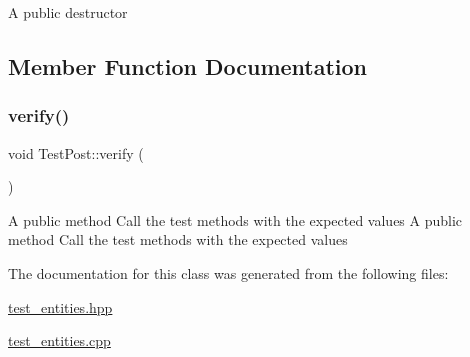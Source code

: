 A public destructor 

\subsection{Member Function Documentation}
\mbox{\label{class_test_post_a8e4d52190e6be295d251dfc348591b92}} 
\subsubsection{\texorpdfstring{verify()}{verify()}}
{\footnotesize\ttfamily void Test\+Post\+::verify (\begin{DoxyParamCaption}{ }\end{DoxyParamCaption})}

A public method Call the test methods with the expected values A public method Call the test methods with the expected values 

The documentation for this class was generated from the following files\+:\begin{DoxyCompactItemize}
\item 
\hyperlink{test__entities_8hpp}{test\+\_\+entities.\+hpp}\item 
\hyperlink{test__entities_8cpp}{test\+\_\+entities.\+cpp}\end{DoxyCompactItemize}
